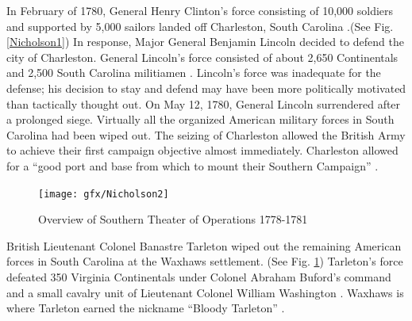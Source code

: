 In February of 1780, General Henry Clinton’s force consisting of 10,000 soldiers
and supported by 5,000 sailors landed off Charleston, South Carolina
\cite[p.6]{weigley_partisan_1970}.(See Fig. \ref{Nicholson1})
In response, Major General Benjamin Lincoln decided to defend the city of
Charleston.  General Lincoln’s force consisted of about 2,650 Continentals and
2,500 South Carolina militiamen \cite[p.6]{weigley_partisan_1970}.  Lincoln’s
force was inadequate for the defense; his decision to stay and defend may have
been more politically motivated than tactically thought out.  On May 12, 1780,
General Lincoln surrendered after a prolonged siege.  Virtually all the
organized American military forces in South Carolina had been wiped out.  The
seizing of Charleston allowed the British Army to achieve their first campaign
objective almost immediately.  Charleston allowed for a “good port and base from
which to mount their Southern Campaign” \cite[p.22]{woodward_comparative_2002}.




\begin{figure}[ht]
\begin{center}
\texttt{[image: gfx/Nicholson2]}
\end{center}
\caption{Overview of Southern Theater of Operations 1778-1781 \cite[Tab D, Map 1]{rauch_battle_2007}}
\label{Nicholson2}
\end{figure}

British Lieutenant Colonel Banastre Tarleton wiped out the remaining American
forces in South Carolina at the Waxhaws settlement.  (See Fig. \ref{Nicholson2})
Tarleton’s force defeated 350 Virginia Continentals under Colonel Abraham
Buford’s command and a small cavalry unit of Lieutenant Colonel William
Washington \cite[p.7]{weigley_partisan_1970}.  Waxhaws is where Tarleton earned the nickname
“Bloody Tarleton” \cite[p.20]{moncure_cowpens_1996}.



